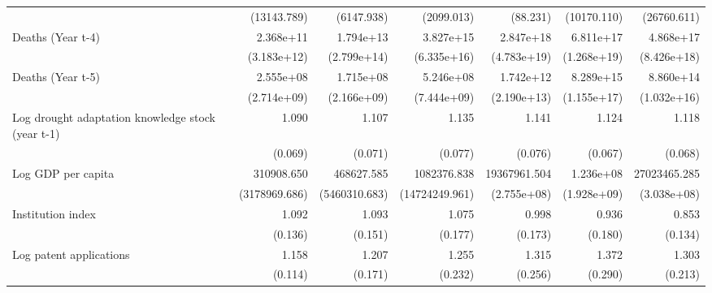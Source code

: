 \begin{table}[htbp]
\begin{tabular}{l*{6}{D{.}{.}{-1}}}
                    & (13143.789)         &  (6147.938)         &  (2099.013)         &    (88.231)         & (10170.110)         & (26760.611)         \\
\addlinespace
Deaths (Year t-4)   &   2.368e+11\sym{*}  &   1.794e+13\sym{*}  &   3.827e+15\sym{**} &   2.847e+18\sym{**} &   6.811e+17\sym{**} &   4.868e+17\sym{**} \\
                    & (3.183e+12)         & (2.799e+14)         & (6.335e+16)         & (4.783e+19)         & (1.268e+19)         & (8.426e+18)         \\
\addlinespace
Deaths (Year t-5)   &   2.555e+08\sym{*}  &   1.715e+08         &   5.246e+08         &   1.742e+12\sym{**} &   8.289e+15\sym{***}&   8.860e+14\sym{***}\\
                    & (2.714e+09)         & (2.166e+09)         & (7.444e+09)         & (2.190e+13)         & (1.155e+17)         & (1.032e+16)         \\
\addlinespace
Log drought adaptation knowledge stock (year t-1)&       1.090         &       1.107         &       1.135\sym{*}  &       1.141\sym{**} &       1.124\sym{*}  &       1.118\sym{*}  \\
                    &     (0.069)         &     (0.071)         &     (0.077)         &     (0.076)         &     (0.067)         &     (0.068)         \\
\addlinespace
Log GDP per capita  &  310908.650         &  468627.585         & 1082376.838         &19367961.504         &   1.236e+08         &27023465.285         \\
                    &(3178969.686)         &(5460310.683)         &(14724249.961)         & (2.755e+08)         & (1.928e+09)         & (3.038e+08)         \\
\addlinespace
Institution index   &       1.092         &       1.093         &       1.075         &       0.998         &       0.936         &       0.853         \\
                    &     (0.136)         &     (0.151)         &     (0.177)         &     (0.173)         &     (0.180)         &     (0.134)         \\
\addlinespace
Log patent applications&       1.158         &       1.207         &       1.255         &       1.315         &       1.372         &       1.303         \\
                    &     (0.114)         &     (0.171)         &     (0.232)         &     (0.256)         &     (0.290)         &     (0.213)         \\

\end{tabular}
\end{table}
